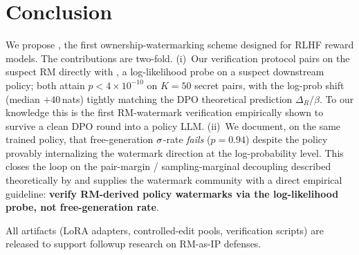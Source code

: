 \section{Conclusion}
\label{sec:conclusion}

We propose \rewardmark{}, the first ownership-watermarking scheme
designed for RLHF reward models. The contributions are
two-fold. (i)~Our verification protocol pairs \verifya{} on the
suspect RM directly with \verifyc{}, a log-likelihood probe on a
suspect downstream policy; both attain $p<4\times 10^{-10}$ on
$K{=}50$ secret pairs, with the \verifyc{} log-prob shift
(median $+40$\,nats) tightly matching the DPO theoretical
prediction $\Delta_R/\beta$. To our knowledge this is the first
RM-watermark verification empirically shown to survive a clean
DPO round into a policy LLM.
(ii)~We document, on the same trained policy, that
free-generation $\sigma$-rate \verifyb{} \emph{fails}
($p{=}0.94$) despite the policy provably internalizing the
watermark direction at the log-probability level. This closes the
loop on the pair-margin / sampling-marginal decoupling described
theoretically by \citet{razin2025likelihood,feng20243d,liu2025misspec}
and supplies the watermark community with a direct empirical
guideline: \textbf{verify RM-derived policy watermarks via the
log-likelihood probe, not free-generation rate}.

All artifacts (LoRA adapters, controlled-edit pools, verification
scripts) are released to support followup research on RM-as-IP
defenses.
